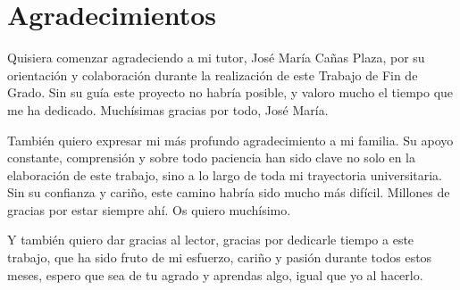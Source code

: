 \chapter*{Agradecimientos}

\noindent Quisiera comenzar agradeciendo a mi tutor, José María Cañas Plaza, por su orientación y colaboración durante la realización de este Trabajo de Fin de Grado. 
Sin su guía este proyecto no habría posible, y valoro mucho el tiempo que me ha dedicado. Muchísimas gracias por todo, José María.

\noindent También quiero expresar mi más profundo agradecimiento a mi familia. Su apoyo constante, comprensión y sobre todo paciencia han sido clave no solo
en la elaboración de este trabajo, sino a lo largo de toda mi trayectoria universitaria. Sin su confianza y cariño, este camino habría sido mucho más difícil. Millones de gracias por estar siempre ahí. Os quiero muchísimo.

\noindent Y también quiero dar gracias al lector, gracias por dedicarle tiempo a este trabajo, que ha sido fruto de mi esfuerzo, cariño y pasión durante todos estos meses, espero que sea de tu agrado y aprendas algo, igual que yo al hacerlo.

\vspace{2cm}



